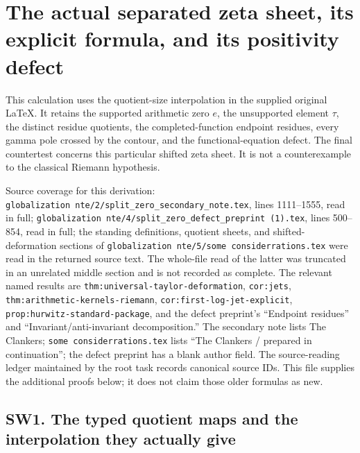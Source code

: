\documentclass[
  10pt,
  a4paper,
]{article}
\author{}
\date{}
\begin{document}
{
\setcounter{tocdepth}{3}
\tableofcontents
}
\section{The actual separated zeta sheet, its explicit formula, and its
positivity
defect}\label{the-actual-separated-zeta-sheet-its-explicit-formula-and-its-positivity-defect}

This calculation uses the quotient-size interpolation in the supplied
original LaTeX. It retains the supported arithmetic zero \(e\), the
unsupported element \(\tau\), the distinct residue quotients, the
completed-function endpoint residues, every gamma pole crossed by the
contour, and the functional-equation defect. The final countertest
concerns this particular shifted zeta sheet. It is not a counterexample
to the classical Riemann hypothesis.

Source coverage for this derivation:
\texttt{globalization\ nte/\allowbreak{}2/\allowbreak{}split\_\allowbreak{}zero\_\allowbreak{}secondary\_\allowbreak{}note.\allowbreak{}tex}, lines
1111--1555, read in full;
\texttt{globalization\ nte/\allowbreak{}4/\allowbreak{}split\_\allowbreak{}zero\_\allowbreak{}defect\_\allowbreak{}preprint\ (1).\allowbreak{}tex},
lines 500--854, read in full; the standing definitions, quotient sheets,
and shifted-deformation sections of
\texttt{globalization\ nte/\allowbreak{}5/\allowbreak{}some\ considerrations.\allowbreak{}tex} were read in the
returned source text. The whole-file read of the latter was truncated in
an unrelated middle section and is not recorded as complete. The
relevant named results are \texttt{thm:\allowbreak{}universal-\allowbreak{}taylor-\allowbreak{}deformation},
\texttt{cor:\allowbreak{}jets}, \texttt{thm:\allowbreak{}arithmetic-\allowbreak{}kernels-\allowbreak{}riemann},
\texttt{cor:\allowbreak{}first-\allowbreak{}log-\allowbreak{}jet-\allowbreak{}explicit},
\texttt{prop:\allowbreak{}hurwitz-\allowbreak{}standard-\allowbreak{}package}, and the defect preprint's
``Endpoint residues'' and ``Invariant/anti-invariant decomposition.''
The secondary note lists The Clankers;
\texttt{some\ considerrations.\allowbreak{}tex} lists ``The Clankers / prepared in
continuation''; the defect preprint has a blank author field. The
source-reading ledger maintained by the root task records canonical
source IDs. This file supplies the additional proofs below; it does not
claim those older formulas as new.

\subsection{SW1. The typed quotient maps and the interpolation they
actually
give}\label{sw1.-the-typed-quotient-maps-and-the-interpolation-they-actually-give}
\end{document}

